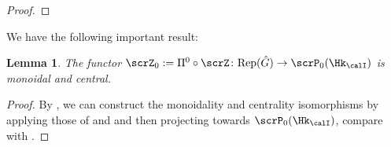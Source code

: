 \documentclass[10pt, reqno]{amsart}
\theoremstyle{plain}
\newtheorem{lemma}[theorem]{Lemma}
\theoremstyle{definition}
\numberwithin{equation}{section}
\begin{document}
\begin{proof}
\end{proof}


We have the following important result:

\begin{lemma}\label{properties_of_Z_0_and_n_0}
	The functor $\scrZ_0:=\Pi^0\circ \scrZ\colon \mathrm{Rep}(\hat{G}) \to \scrP_0(\Hk_{\calI})$ is monoidal and central.
\end{lemma}

\begin{proof}
	By , we can construct the monoidality and centrality isomorphisms by applying those of  and  and then projecting towards $\scrP_0(\Hk_{\calI})$, compare with \cite[Lemma 6.5.15]{AR}.
\end{proof}
\end{document}
